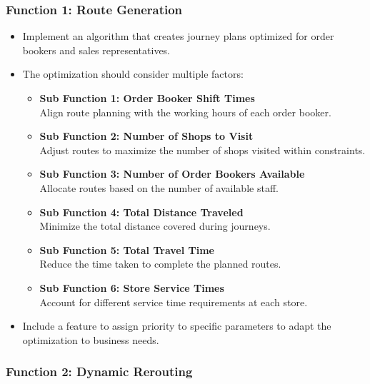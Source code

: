 \subsubsection*{Function 1: Route Generation}
\begin{itemize}
    \item Implement an algorithm that creates journey plans optimized for order bookers and sales representatives.
    \item The optimization should consider multiple factors:
    \begin{itemize}
        \item[] \textbf{Sub Function 1: Order Booker Shift Times} \\
            Align route planning with the working hours of each order booker.
        \item[] \textbf{Sub Function 2: Number of Shops to Visit} \\
            Adjust routes to maximize the number of shops visited within constraints.
        \item[] \textbf{Sub Function 3: Number of Order Bookers Available} \\
            Allocate routes based on the number of available staff.
        \item[] \textbf{Sub Function 4: Total Distance Traveled} \\
            Minimize the total distance covered during journeys.
        \item[] \textbf{Sub Function 5: Total Travel Time} \\
            Reduce the time taken to complete the planned routes.
        \item[] \textbf{Sub Function 6: Store Service Times} \\
            Account for different service time requirements at each store.
    \end{itemize}
\end{itemize}
 \begin{itemize}
     \item Include a feature to assign priority to specific parameters to adapt the optimization to business needs.
 \end{itemize}

\subsubsection*{Function 2: Dynamic Rerouting}


